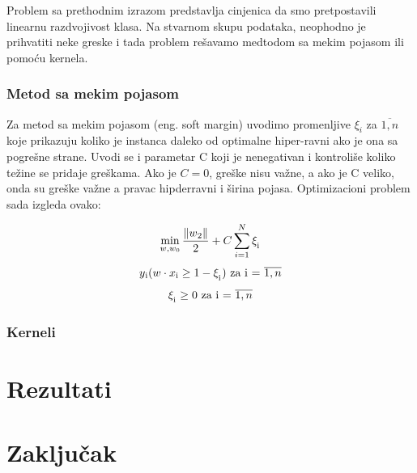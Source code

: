 \documentclass[12pt,oneside]{memoir}
\begin{document}
Problem sa prethodnim izrazom predstavlja cinjenica da smo pretpostavili linearnu razdvojivost klasa.  Na stvarnom skupu podataka, neophodno je prihvatiti neke greske i tada problem rešavamo medtodom sa mekim pojasom ili pomoću kernela.

\subsection{Metod sa mekim pojasom}
Za metod sa mekim pojasom (eng. soft margin) uvodimo promenljive $\xi_i$ za $\overline{1,n}$ koje prikazuju koliko je instanca daleko od optimalne hiper-ravni ako je ona sa pogrešne strane.  Uvodi se i parametar C koji je nenegativan i kontroliše koliko težine se pridaje greškama. Ako je $C=0$, greške nisu važne,  a ako je C veliko, onda su greške važne a pravac hipderravni i širina pojasa.  Optimizacioni problem sada izgleda ovako:

\begin{equation}
	\min_{w,w_0} \frac{\|w\textsubscript{2}\|}{2} + C \sum_{i=1}^{N} \xi_\textsubscript{i} \notag\\
\end{equation}
\begin{equation}
	y\textsubscript{i}(w \cdot x\textsubscript{i} \geq 1 - \xi_\textsubscript{i}) \text{ za i = } \overline{1,n} \notag\\
\end{equation}
\begin{equation}
	\xi_\textsubscript{i} \geq 0 \text{ za i = } \overline{1,n}
\end{equation}

\subsection{Kerneli}



\chapter{Rezultati}



\chapter{Zaključak}



\end{document}
